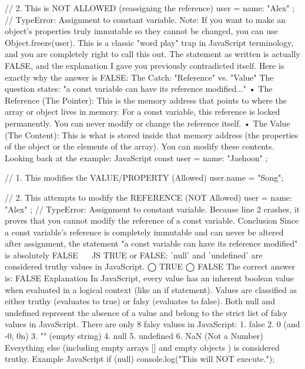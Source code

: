 // 2. This is NOT ALLOWED (reassigning the reference)
user = { name: "Alex" }; // TypeError: Assignment to constant variable.
Note: If you want to make an object's properties truly immutable so they cannot be changed, you can use Object.freeze(user).
This is a classic "word play" trap in JavaScript terminology, and you are completely right to call this out.
The statement as written is actually FALSE, and the explanation I gave you previously contradicted itself. Here is exactly why the answer is FALSE:
The Catch: "Reference" vs. "Value"
The question states: "a const variable can have its reference modified..."
•	The Reference (The Pointer): This is the memory address that points to where the array or object lives in memory. For a const variable, this reference is locked permanently. You can never modify or change the reference itself.
•	The Value (The Content): This is what is stored inside that memory address (the properties of the object or the elements of the array). You can modify these contents.
Looking back at the example:
JavaScript
const user = { name: "Jaehoon" };

// 1. This modifies the VALUE/PROPERTY (Allowed)
user.name = "Song"; 

// 2. This attempts to modify the REFERENCE (NOT Allowed)
user = { name: "Alex" }; // TypeError: Assignment to constant variable.
Because line 2 crashes, it proves that you cannot modify the reference of a const variable.
Conclusion
Since a const variable's reference is completely immutable and can never be altered after assignment, the statement "a const variable can have its reference modified" is absolutely FALSE
 
JS
TRUE or FALSE: ˋnullˋ and ˋundefinedˋ are considered truthy values in JavaScript.
◯ TRUE
◯ FALSE
The correct answer is:
FALSE
Explanation
In JavaScript, every value has an inherent boolean value when evaluated in a logical context (like an if statement). Values are classified as either truthy (evaluates to true) or falsy (evaluates to false).
Both null and undefined represent the absence of a value and belong to the strict list of falsy values in JavaScript.
There are only 8 falsy values in JavaScript:
1.	false
2.	0 (and -0, 0n)
3.	"" (empty string)
4.	null
5.	undefined
6.	NaN (Not a Number)
Everything else (including empty arrays [] and empty objects {}) is considered truthy.
Example
JavaScript
if (null) {
  console.log("This will NOT execute.");
}

